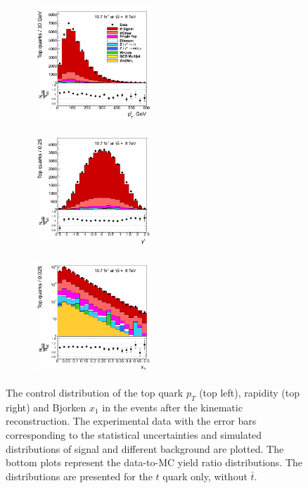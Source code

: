 \begin{figure}[h]
\centering
\begin{subfigure}
  \centering
  \includegraphics[width=0.49\textwidth]{05_kinReco/plots/CP_top_pt.png}
\end{subfigure}
\begin{subfigure}
  \centering
  \includegraphics[width=0.49\textwidth]{05_kinReco/plots/CP_top_rapidity.png}
\end{subfigure}
\begin{subfigure}
  \centering
  \includegraphics[width=0.49\textwidth]{05_kinReco/plots/CP_x1.png}
\end{subfigure}
\caption{The control distribution of the top quark $p_{T}$ (top left), rapidity (top right) and Bjorken $x_{1}$ in the events 
 after the kinematic reconstruction. The experimental data with the error bars corresponding to the statistical uncertainties
 and simulated distributions of signal and different background are plotted. The bottom plots represent the data-to-MC yield ratio distributions. 
 The distributions are presented for the $t$ quark only, without $\bar{t}$.}
\label{fig:CPkinTop}
\end{figure}

